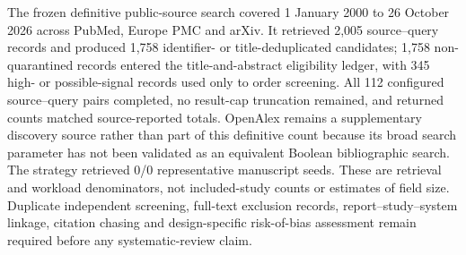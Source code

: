 The frozen definitive public-source search covered 1 January 2000 to 26 October 2026 across PubMed, Europe PMC and arXiv. It retrieved 2,005 source--query records and produced 1,758 identifier- or title-deduplicated candidates; 1,758 non-quarantined records entered the title-and-abstract eligibility ledger, with 345 high- or possible-signal records used only to order screening. All 112 configured source--query pairs completed, no result-cap truncation remained, and returned counts matched source-reported totals. OpenAlex remains a supplementary discovery source rather than part of this definitive count because its broad search parameter has not been validated as an equivalent Boolean bibliographic search. The strategy retrieved 0/0 representative manuscript seeds. These are retrieval and workload denominators, not included-study counts or estimates of field size. Duplicate independent screening, full-text exclusion records, report--study--system linkage, citation chasing and design-specific risk-of-bias assessment remain required before any systematic-review claim.
